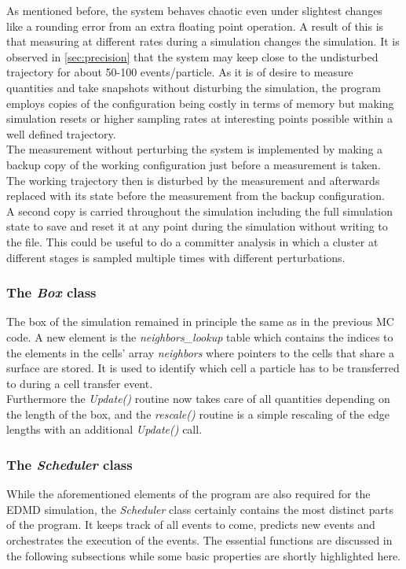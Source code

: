 As mentioned before, the system behaves chaotic even under slightest changes like a rounding error from an extra floating point operation. A result of this is that measuring at different rates during a simulation changes the simulation. It is observed in \autoref{sec:precision} that the system may keep close to the undisturbed trajectory for about 50-100 events/particle. As it is of desire to measure quantities and take snapshots without disturbing the simulation, the program employs copies of the configuration being costly in terms of memory but making simulation resets or higher sampling rates at interesting points possible within a well defined trajectory.\\ 

The measurement without perturbing the system is implemented by making a backup copy of the working configuration just before a measurement is taken. The working trajectory then is disturbed by the measurement and afterwards replaced with its state before the measurement from the backup configuration.\\
A second copy is carried throughout the simulation including the full simulation state to save and reset it at any point during the simulation without writing to the file. This could be useful to do a committer analysis in which a cluster at different stages is sampled multiple times with different perturbations.

\subsubsection{The \textit{Box} class}
\label{sec:box_class}
The box of the simulation remained in principle the same as in the previous MC code. A new element is the \textit{neighbors\_lookup} table which contains the indices to the elements in the cells' array \textit{neighbors} where pointers to the cells that share a surface are stored. It is used to identify which cell a particle has to be transferred to during a cell transfer event.\\

Furthermore the \textit{Update()} routine now takes care of all quantities depending on the length of the box, and the \textit{rescale()} routine is a simple rescaling of the edge lengths with an additional \textit{Update()} call.

\subsubsection{The \textit{Scheduler} class}
\label{sec:scheduler_class}
While the aforementioned elements of the program are also required for the EDMD simulation, the \textit{Scheduler} class certainly contains the most distinct parts of the program. It keeps track of all events to come, predicts new events and orchestrates the execution of the events. The essential functions are discussed in the following subsections while some basic properties are shortly highlighted here.\\

